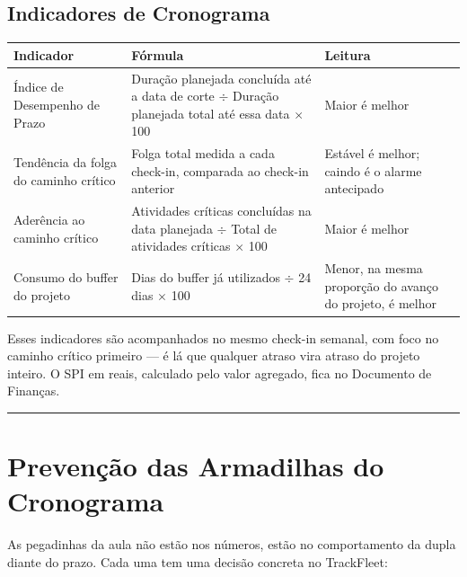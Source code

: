 \documentclass[11pt,a4paper]{article}
\newcommand{\separador}{\par\vspace{2mm}\hrule\vspace{4mm}}
\begin{document}
\subsection{Indicadores de Cronograma}
\begin{center}
\begin{tabularx}{\textwidth}{L L l}
\toprule
\textbf{Indicador} & \textbf{Fórmula} & \textbf{Leitura} \\
\midrule
Índice de Desempenho de Prazo & Duração planejada concluída até a data de corte $\div$ Duração planejada total até essa data $\times$ 100 & Maior é melhor \\
Tendência da folga do caminho crítico & Folga total medida a cada check-in, comparada ao check-in anterior & Estável é melhor; caindo é o alarme antecipado \\
Aderência ao caminho crítico & Atividades críticas concluídas na data planejada $\div$ Total de atividades críticas $\times$ 100 & Maior é melhor \\
Consumo do buffer do projeto & Dias do buffer já utilizados $\div$ 24 dias $\times$ 100 & Menor, na mesma proporção do avanço do projeto, é melhor \\
\bottomrule
\end{tabularx}
\end{center}

\noindent Esses indicadores são acompanhados no mesmo check-in semanal, com foco no caminho crítico primeiro --- é lá que qualquer atraso vira atraso do projeto inteiro. O SPI em reais, calculado pelo valor agregado, fica no Documento de Finanças.

\separador

\section{Prevenção das Armadilhas do Cronograma}\label{cro:armadilhas}

\noindent As pegadinhas da aula não estão nos números, estão no comportamento da dupla diante do prazo. Cada uma tem uma decisão concreta no TrackFleet:
\end{document}

